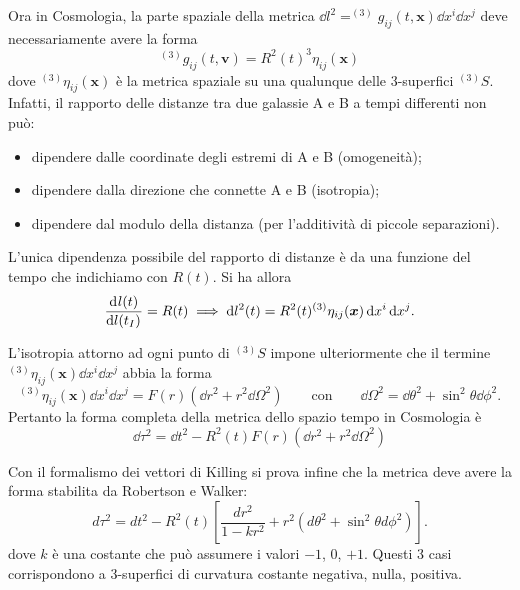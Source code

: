 Ora in Cosmologia, la parte spaziale della metrica $\dd
l^2=^{(3)}g_{ij}(t,\bm{x}) \dd x^i \dd x^j$ deve necessariamente avere la forma
\begin{equation}
  ^{(3)}g_{ij}(t,\bm{v}) = R^2(t) ^{3}\eta_{ij}(\bm{x})
  \label{metrica_eta}
\end{equation}
dove $^{(3)}\eta_{ij}(\bm x)$ è la metrica spaziale su una qualunque delle
3-superfici $^{(3)}S$. Infatti, il rapporto delle distanze tra due
galassie A e B
a tempi differenti non può:
\begin{itemize}
\item dipendere dalle coordinate degli estremi di A e B (omogeneità);
\item dipendere dalla direzione che connette A e B (isotropia);
\item dipendere dal modulo della distanza (per l'additività di piccole
  separazioni).
\end{itemize}
L'unica dipendenza possibile del rapporto di distanze è da una funzione del
tempo che indichiamo con $R(t)$.  Si ha allora
\begin{equation}
  \frac{{\mathop{}\!\mathrm{d}^{}}l(t)}{\mathop{}\!\mathrm{d} {l(t_I)}^{}} = R(t) \implies \mathop{}\!\mathrm{d} l^2(t) =
  R^2(t)^{(3)}\eta_{ij}(\bm{x}) \mathop{}\!\mathrm{d} x^i \mathop{}\!\mathrm{d} x^j.
\end{equation}

L'isotropia attorno ad ogni punto di $^{(3)}S$ impone ulteriormente che il
termine $^{(3)}\eta_{ij}(\bm{x}) \dd x^i \dd x^j$ abbia la forma
\begin{equation}
  ^{(3)}\eta_{ij}(\bm{x}) \dd x^i \dd x^j = F(r) (\dd r^2 +r^2 \dd\Omega^2)
  \qquad\text{con}\qquad \dd\Omega^2 = \dd\theta^2 + \sin^2 \theta \dd\phi^2.
\end{equation}
Pertanto la forma completa della metrica dello spazio tempo in Cosmologia è
\begin{equation}
  \dd \tau^2 = \dd t^2 -  R^2(t) F(r) \left(\dd r^2 +r^2 \dd\Omega^2 \right)
  \label{forma_F(r)}
\end{equation}

Con il formalismo dei vettori di Killing si prova infine che la metrica deve
avere la forma stabilita da Robertson e Walker:
\begin{equation}
  d \tau^2 = dt^2 - R^2(t) \left[ \frac {dr^2}{1-kr^2} + r^2
    \left(d\theta^2+\sin^2 \theta d\phi^2\right) \right].
\end{equation}
dove $k$ è una costante che può assumere i valori $-1$, $0$, $+1$.  Questi 3
casi corrispondono a 3-superfici di curvatura costante negativa, nulla,
positiva.

